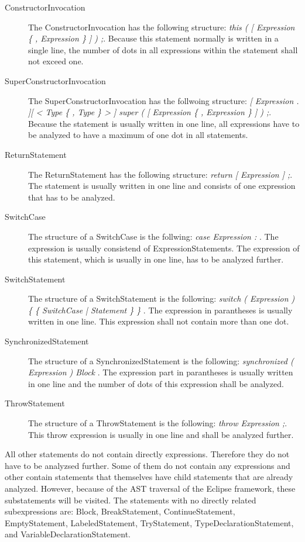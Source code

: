 \begin{description}
  \item[ConstructorInvocation] The ConstructorInvocation has the following structure: \textit{this ( [ Expression \{ , Expression \} ] ) ;}. Because this statement normally is written in a single line, the number of dots in all expressions within the statement shall not exceed one.
  \item[SuperConstructorInvocation] The SuperConstructorInvocation has the follwoing structure: \textit{[ Expression . ][ < Type \{ , Type \} > ] super ( [ Expression \{ , Expression \} ] ) ;}. Because the statement is usually written in one line, all expressions have to be analyzed to have a maximum of one dot in all statements.
  \item[ReturnStatement] The ReturnStatement has the following structure: \textit{return [ Expression ] ;}. The statement is usually written in one line and consists of one expression that has to be analyzed.
  \item[SwitchCase] The structure of a SwitchCase is the follwing: \textit{ case Expression  : }. The expression is usually consistend of ExpressionStatements. The expression of this statement, which is usually in one line, has to be analyzed further.
  \item[SwitchStatement] The structure of a SwitchStatement is the following: \textit{ switch ( Expression ) \{ \{ SwitchCase | Statement \} \} }. The expression in parantheses is usually written in one line. This expression shall not contain more than one dot.
  \item[SynchronizedStatement] The structure of a SynchronizedStatement is the following: \textit{  synchronized ( Expression ) Block }. The expression part in parantheses is usually written in one line and the number of dots of this expression shall be analyzed.
  \item[ThrowStatement] The structure of a ThrowStatement is the following: \textit{throw Expression ;}. This throw expression is usually in one line and shall be analyzed further.
\end{description}

All other statements do not contain directly expressions. Therefore they do not have to be analyzsed further. Some of them do not contain any expressions and other contain statements that themselves have child statements that are already analyzed. However, because of the \acf{AST} traversal of the Eclipse framework, these substatements will be visited. The statements with no directly related subexpressions are: Block, BreakStatement, ContinueStatement, EmptyStatement, LabeledStatement, TryStatement, TypeDeclarationStatement, and VariableDeclarationStatement.
\\

